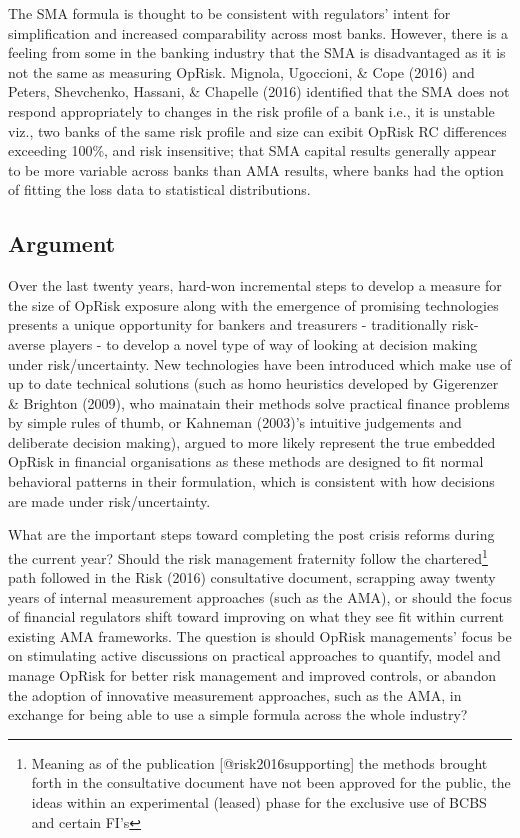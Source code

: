 \documentclass{DissertateUSU}
\begin{document}
The SMA formula is thought to be consistent with regulators' intent for
simplification and increased comparability across most banks. However,
there is a feeling from some in the banking industry that the SMA is
disadvantaged as it is not the same as measuring OpRisk. Mignola,
Ugoccioni, \& Cope (2016) and Peters, Shevchenko, Hassani, \& Chapelle
(2016) identified that the SMA does not respond appropriately to changes
in the risk profile of a bank i.e., it is unstable viz., two banks of
the same risk profile and size can exibit OpRisk RC differences
exceeding 100\%, and risk insensitive; that SMA capital results
generally appear to be more variable across banks than AMA results,
where banks had the option of fitting the loss data to statistical
distributions.

\subsection{Argument}
\label{ssec:Argument}

Over the last twenty years, hard-won incremental steps to develop a
measure for the size of OpRisk exposure along with the emergence of
promising technologies presents a unique opportunity for bankers and
treasurers - traditionally risk-averse players - to develop a novel type
of way of looking at decision making under risk/uncertainty. New
technologies have been introduced which make use of up to date technical
solutions (such as homo heuristics developed by Gigerenzer \& Brighton
(2009), who mainatain their methods solve practical finance problems by
simple rules of thumb, or Kahneman (2003)'s intuitive judgements and
deliberate decision making), argued to more likely represent the true
embedded OpRisk in financial organisations as these methods are designed
to fit normal behavioral patterns in their formulation, which is
consistent with how decisions are made under risk/uncertainty.\medskip 

What are the important steps toward completing the post crisis reforms
during the current year? Should the risk management fraternity follow
the
chartered\footnote{Meaning as of the publication [@risk2016supporting] the methods brought forth in the consultative document have not been approved for the public, the ideas within an experimental (leased) phase for the exclusive use of BCBS and certain FI's}
path followed in the Risk (2016) consultative document, scrapping away
twenty years of internal measurement approaches (such as the AMA), or
should the focus of financial regulators shift toward improving on what
they see fit within current existing AMA frameworks. The question is
should OpRisk managements' focus be on stimulating active discussions on
practical approaches to quantify, model and manage OpRisk for better
risk management and improved controls, or abandon the adoption of
innovative measurement approaches, such as the AMA, in exchange for
being able to use a simple formula across the whole industry?\medskip 
\end{document}
